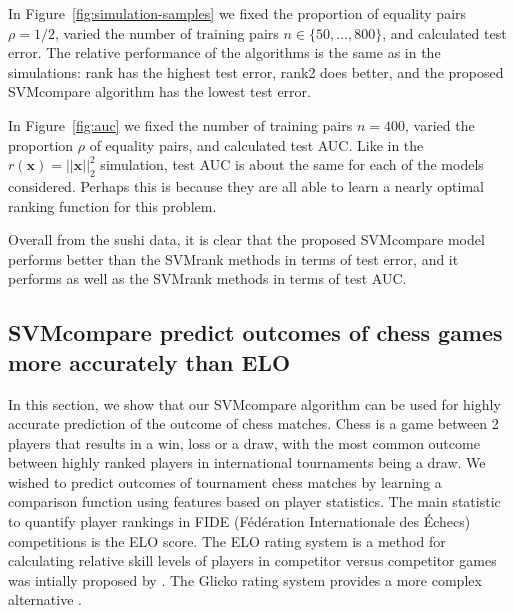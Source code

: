 \documentclass[twoside,11pt]{article}
\newcommand{\changed}[1]{
  #1
}
\begin{document}
In Figure~\ref{fig:simulation-samples} we fixed the proportion of
equality pairs $\rho=1/2$, varied the number of training pairs
$n\in\{50,\dots, 800\}$, and calculated test error. The relative
performance of the algorithms is the same as in the simulations: rank
has the highest test error, rank2 does better, and the proposed
SVMcompare algorithm has the lowest test error.

In Figure~\ref{fig:auc} we fixed the number of training pairs $n=400$,
varied the proportion $\rho$ of equality pairs, and calculated test
AUC. \changed{Like in the $r(\mathbf x)=||\mathbf x||_2^2$ simulation,
  test AUC is about the same for each of the models
  considered. Perhaps this is because they are all able to learn a
  nearly optimal ranking function for this problem.}

\changed{Overall from the sushi data, it is clear that the proposed SVMcompare
model performs better than the SVMrank methods in terms of test error,
and it performs as well as the SVMrank methods in terms of test AUC.
}

\subsection{SVMcompare predict outcomes of chess games more accurately than ELO}

In this section, we show that our SVMcompare algorithm can be used for
highly accurate prediction of the outcome of chess matches. Chess is a
game between 2 players that results in a win, loss or a draw, with the
most common outcome between highly ranked players in international
tournaments being a draw. We wished to predict outcomes of tournament
chess matches by learning a comparison function using features based
on player statistics.  The main statistic to quantify player rankings
in FIDE (Fédération Internationale des Échecs) competitions is the ELO
score.  The ELO rating system is a method for calculating relative
skill levels of players in competitor versus competitor games was
intially proposed by \citet{elo_score}.
The Glicko rating system 
provides a more complex alternative \citep{GLICKO}.
\end{document}
